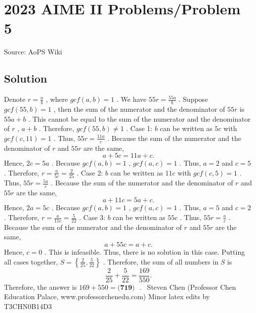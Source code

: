 \documentclass[12pt]{article}
\begin{document}
\section*{{2023 AIME II Problems/Problem 5}}
Source: AoPS Wiki

\subsection*{Solution}
Denote $r = \frac{a}{b}$ , where $gcf\left( a, b \right) = 1$ .
We have $55 r = \frac{55a}{b}$ .
Suppose $gcf\left( 55, b \right) = 1$ , then the sum of the numerator and the denominator of $55r$ is $55a + b$ .
This cannot be equal to the sum of the numerator and the denominator of $r$ , $a + b$ .
Therefore, $gcf\left( 55, b \right) \neq 1$ . Case 1: $b$ can be written as $5c$ with $gcf\left( c, 11 \right) = 1$ . Thus, $55r = \frac{11a}{c}$ . Because the sum of the numerator and the denominator of $r$ and $55r$ are the same, \[ a + 5c = 11a + c . \] Hence, $2c = 5 a$ . Because $gcf\left( a, b \right) = 1$ , $gcf\left( a, c \right) = 1$ .
Thus, $a = 2$ and $c = 5$ .
Therefore, $r = \frac{a}{5c} = \frac{2}{25}$ . Case 2: $b$ can be written as $11c$ with $gcf\left( c, 5 \right) = 1$ . Thus, $55r = \frac{5a}{c}$ . Because the sum of the numerator and the denominator of $r$ and $55r$ are the same, \[ a + 11c = 5a + c . \] Hence, $2a = 5 c$ . Because $gcf\left( a, b \right) = 1$ , $gcf\left( a, c \right) = 1$ .
Thus, $a = 5$ and $c = 2$ .
Therefore, $r = \frac{a}{11c} = \frac{5}{22}$ . Case 3: $b$ can be written as $55 c$ . Thus, $55r = \frac{a}{c}$ . Because the sum of the numerator and the denominator of $r$ and $55r$ are the same, \[ a + 55c = a + c . \] Hence, $c = 0$ . This is infeasible.
Thus, there is no solution in this case. Putting all cases together, $S = \left\{ \frac{2}{25}, \frac{5}{22} \right\}$ .
Therefore, the sum of all numbers in $S$ is \[ \frac{2}{25} + \frac{5}{22} = \frac{169}{550} . \] Therefore, the answer is $169 + 550 = \boxed{\textbf{(719) }}$ . ~Steven Chen (Professor Chen Education Palace, www.professorchenedu.com) Minor latex edits by T3CHN0B14D3
\end{document}
